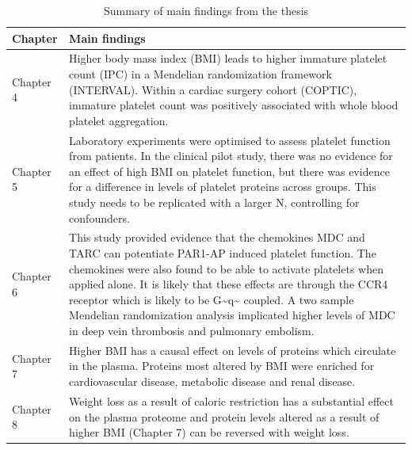 \documentclass[11pt,twoside]{bristolthesis}
\begin{document}
\begin{landscape}\begin{table}

\caption{\label{tab:main-thesis-findings}Summary of main findings from the thesis}
\centering
\begin{tabu} to 
\toprule
Chapter & Main findings\\
\midrule
Chapter 4 & Higher body mass index (BMI) leads to higher immature platelet count (IPC) in a Mendelian randomization framework (INTERVAL). Within a cardiac surgery cohort (COPTIC), immature platelet count was positively associated with whole blood platelet aggregation.\\
Chapter 5 & Laboratory experiments were optimised to assess platelet function from patients. In the clinical pilot study, there was no evidence for an effect of high BMI on platelet function, but there was evidence for a difference in levels of platelet proteins across groups. This study needs to be replicated with a larger N, controlling for confounders.\\
Chapter 6 & This study provided evidence that the chemokines MDC and TARC can potentiate PAR1-AP induced platelet function. The chemokines were also found to be able to activate platelets when applied alone. It is likely that these effects are through the CCR4 receptor which is likely to be G\textasciitilde{}q\textasciitilde{} coupled. A two sample Mendelian randomization analysis implicated higher levels of MDC in deep vein thrombosis and pulmonary embolism.\\
Chapter 7 & Higher BMI has a causal effect on levels of proteins which circulate in the plasma. Proteins most altered by BMI were enriched for cardiovascular disease, metabolic disease and renal disease.\\
Chapter 8 & Weight loss as a result of caloric restriction has a substantial effect on the plasma proteome and protein levels altered as a result of higher BMI (Chapter 7) can be reversed with weight loss.\\
\bottomrule
\end{tabu}
\end{table}
\end{landscape}
\end{document}
